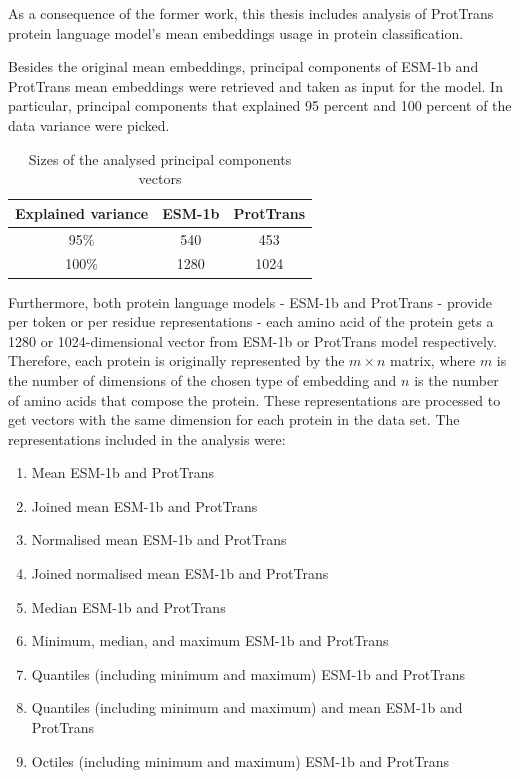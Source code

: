 \documentclass[12pt]{article}
\begin{document}
	As a consequence of the former work, this thesis includes 
	analysis of ProtTrans protein language model's mean embeddings 
	usage in protein classification. 

	Besides the original mean embeddings, principal components 
	of ESM-1b and ProtTrans
	mean embeddings were retrieved and taken as input for the 
	model. In particular, principal components that explained 
	95 percent and 100 percent of the data variance were picked.

	\begin{table}[h!]
		\caption{Sizes of the analysed principal components 
		vectors}
		\vspace{0.2cm}
		\centering
		\begin{tabular}{ | c | c c | }
			\hline 
			Explained variance & ESM-1b & ProtTrans \\
			\hline 
			95\% & 540 & 453 \\
			100\% & 1280 & 1024 \\
			\hline    
		\end{tabular}
		\label{table:vectorsPCADimensions}
	\end{table}
	
	Furthermore, both protein language models - ESM-1b and 
	ProtTrans - provide 
	per token or per residue representations - each 
	amino acid of the protein gets a 1280 or 1024-dimensional vector from
	ESM-1b or ProtTrans model respectively. Therefore, each protein is 
	originally represented by the ${m \times n}$ matrix, 
	where ${m}$ is the number of dimensions of the chosen type of embedding
	and ${n}$ is the number of amino acids that compose the protein. 
	These representations are processed to get vectors with the same 
	dimension 
	for each protein in the data set. The representations 
	included in the analysis were:

	\begin{enumerate}
		\item Mean ESM-1b and ProtTrans 
		\item Joined mean ESM-1b and ProtTrans
		\item Normalised mean ESM-1b and ProtTrans
		\item Joined normalised mean ESM-1b and ProtTrans
		\item Median ESM-1b and ProtTrans
		\item Minimum, median, and maximum ESM-1b and ProtTrans
		\item Quantiles (including minimum and maximum) ESM-1b and ProtTrans
		\item Quantiles (including minimum and maximum) and mean ESM-1b and ProtTrans
		\item Octiles (including minimum and maximum) ESM-1b and ProtTrans
	\end{enumerate}
\end{document}
